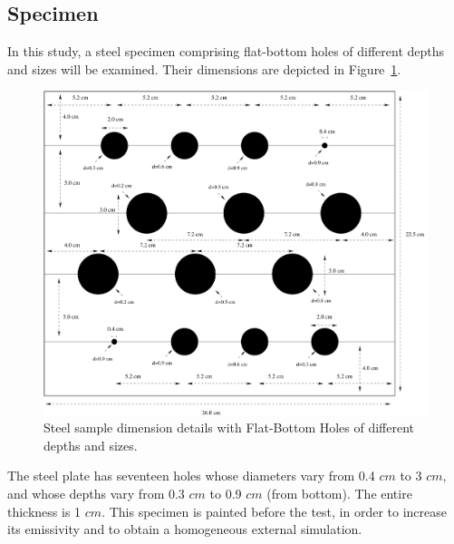 \documentclass[]{spie}  %
\begin{document}
\subsection{Specimen} %
\label{sub:specimen}
In this study, a steel specimen comprising flat-bottom holes of different depths and sizes will be examined. Their dimensions are depicted in Figure~\ref{specimen}.
   \begin{figure}[ht]
   \centering   
   \includegraphics[scale=0.4]{graph/specimen_schema.pdf}
   \caption{Steel sample dimension details with Flat-Bottom Holes of different depths and sizes.}
    \label{specimen} 
   \end{figure}  

The steel plate has seventeen holes whose diameters vary from 0.4 $cm$  to 3 $cm$, and whose depths vary from 0.3 $cm$ to 0.9 $cm$ (from bottom). The entire thickness is 1 $cm$. This specimen is painted before the test, in order to increase its emissivity and to obtain a homogeneous external simulation.

\end{document}
